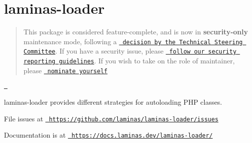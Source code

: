\chapter{laminas-\/loader}
\hypertarget{md_public_2glpi_2vendor_2laminas_2laminas-loader_2_r_e_a_d_m_e}{}\label{md_public_2glpi_2vendor_2laminas_2laminas-loader_2_r_e_a_d_m_e}
\label{md_public_2glpi_2vendor_2laminas_2laminas-loader_2_r_e_a_d_m_e_autotoc_md6282}%
%
 \begin{quote}
This package is considered feature-\/complete, and is now in {\bfseries{security-\/only}} maintenance mode, following a \href{https://github.com/laminas/technical-steering-committee/blob/2b55453e172a1b8c9c4c212be7cf7e7a58b9352c/meetings/minutes/2020-08-03-TSC-Minutes.md\#vote-on-components-to-mark-as-security-only}{\texttt{ decision by the Technical Steering Committee}}. If you have a security issue, please \href{https://getlaminas.org/security/}{\texttt{ follow our security reporting guidelines}}. If you wish to take on the role of maintainer, please \href{https://github.com/laminas/technical-steering-committee/issues/new?assignees=&labels=Nomination&template=Maintainer_Nomination.md&title=\%5BNOMINATION\%5D\%5BMAINTAINER\%5D\%3A+\%7Bname+of+person+being+nominated\%7D}{\texttt{ nominate yourself}} \end{quote}


\href{https://github.com/laminas/laminas-loader/actions?query=workflow\%3A}{\texttt{ }}

laminas-\/loader provides different strategies for autoloading PHP classes.


\begin{DoxyItemize}
\item File issues at \href{https://github.com/laminas/laminas-loader/issues}{\texttt{ https\+://github.\+com/laminas/laminas-\/loader/issues}}
\item Documentation is at \href{https://docs.laminas.dev/laminas-loader/}{\texttt{ https\+://docs.\+laminas.\+dev/laminas-\/loader/}} 
\end{DoxyItemize}